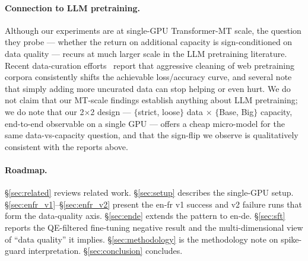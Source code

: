 \paragraph{Connection to LLM pretraining.}
Although our experiments are at single-GPU Transformer-MT scale, the question they probe --- whether the return on additional capacity is sign-conditioned on data quality --- recurs at much larger scale in the LLM pretraining literature. Recent data-curation efforts~\cite{penedo2024fineweb, abdin2024phi3, grattafiori2024llama3} report that aggressive cleaning of web pretraining corpora consistently shifts the achievable loss/accuracy curve, and several note that simply adding more uncurated data can stop helping or even hurt. We do not claim that our MT-scale findings establish anything about LLM pretraining; we do note that our 2$\times$2 design --- $\{$strict, loose$\}$ data $\times$ $\{$Base, Big$\}$ capacity, end-to-end observable on a single GPU --- offers a cheap micro-model for the same data-vs-capacity question, and that the sign-flip we observe is qualitatively consistent with the reports above.

\paragraph{Roadmap.}
\S\ref{sec:related} reviews related work. \S\ref{sec:setup} describes the single-GPU setup. \S\ref{sec:enfr_v1}--\S\ref{sec:enfr_v2} present the en-fr v1 success and v2 failure runs that form the data-quality axis. \S\ref{sec:ende} extends the pattern to en-de. \S\ref{sec:sft} reports the QE-filtered fine-tuning negative result and the multi-dimensional view of ``data quality'' it implies. \S\ref{sec:methodology} is the methodology note on spike-guard interpretation. \S\ref{sec:conclusion} concludes.
